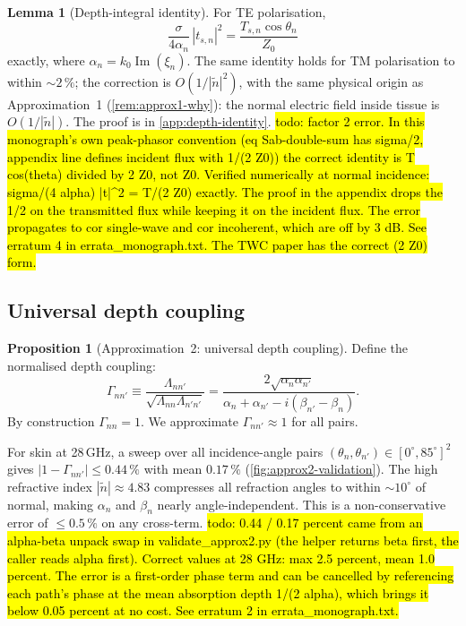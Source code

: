 \documentclass[11pt,a4paper]{article}
\theoremstyle{definition}      %
\newtheorem{proposition}[proposition]{Proposition}
\newtheorem{lemma}[lemma]{Lemma}
\begin{document}
\begin{lemma}[Depth-integral identity]\label{lem:depth-id}
For TE polarisation,
\begin{equation}\label{eq:depth-id}
  \frac{\sigma}{4\alpha_n}\,|t_{s,n}|^2 = \frac{T_{s,n}\cos\theta_n}{Z_0}
\end{equation}
exactly, where $\alpha_n = k_0\operatorname{Im}(\xi_n)$.  The same identity holds
for TM polarisation to within $\sim\!2\,\%$; the correction is
$O(1/|\tilde{n}|^2)$, with the same physical origin as
Approximation~1 (\cref{rem:approx1-why}): the normal electric field
inside tissue is $O(1/|\tilde{n}|)$.  The proof is in
\cref{app:depth-identity}.
\hl{todo: factor 2 error. In this monograph's own peak-phasor
convention (eq Sab-double-sum has sigma/2, appendix line defines
incident flux with 1/(2 Z0)) the correct identity is T cos(theta)
divided by 2 Z0, not Z0. Verified numerically at normal incidence:
sigma/(4 alpha) |t|^2 = T/(2 Z0) exactly. The proof in the appendix
drops the 1/2 on the transmitted flux while keeping it on the incident
flux. The error propagates to cor single-wave and cor incoherent,
which are off by 3 dB. See erratum 4 in errata\_monograph.txt. The TWC
paper has the correct (2 Z0) form.}
\end{lemma}

\subsection{Universal depth coupling}\label{sec:approx2}

\begin{proposition}[Approximation~2: universal depth coupling]\label{prop:approx2}
Define the normalised depth coupling:
\begin{equation}\label{eq:Gamma}
  \Gamma_{nn'} \equiv \frac{\Lambda_{nn'}}{\sqrt{\Lambda_{nn}\Lambda_{n'n'}}}
  = \frac{2\sqrt{\alpha_n\alpha_{n'}}}{\alpha_n + \alpha_{n'} - i(\beta_{n'}-\beta_n)}.
\end{equation}
By construction $\Gamma_{nn} = 1$.  We approximate
$\Gamma_{nn'} \approx 1$ for all pairs.

For skin at 28\,GHz, a sweep over all incidence-angle pairs
$(\theta_n, \theta_{n'}) \in [0^\circ, 85^\circ]^2$ gives
$|1 - \Gamma_{nn'}| \leq 0.44\,\%$ with mean $0.17\,\%$
(\cref{fig:approx2-validation}).  The high refractive index
$|\tilde{n}| \approx 4.83$ compresses all refraction angles to within
$\sim\!10^\circ$ of normal, making $\alpha_n$ and $\beta_n$ nearly
angle-independent.  This is a non-conservative error of $\leq 0.5\,\%$
on any cross-term.
\hl{todo: 0.44 / 0.17 percent came from an alpha-beta unpack swap in
validate\_approx2.py (the helper returns beta first, the caller reads
alpha first). Correct values at 28 GHz: max 2.5 percent, mean 1.0
percent. The error is a first-order phase term and can be cancelled by
referencing each path's phase at the mean absorption depth 1/(2 alpha),
which brings it below 0.05 percent at no cost. See erratum 2 in
errata\_monograph.txt.}
\end{proposition}
\end{document}
